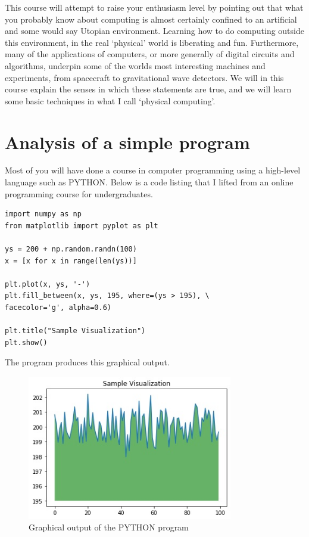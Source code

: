 \documentclass[../physical_computing.tex]{subfiles}
\begin{document}
This course will attempt to raise your enthusiasm level by pointing out that what you probably know about computing is almost certainly confined to an artificial and some would say Utopian environment. Learning how to do computing outside this environment, in the real `physical' world is liberating and fun. Furthermore, many of the applications of computers, or more generally of digital circuits and algorithms, underpin some of the worlds most interesting machines and experiments, from spacecraft to gravitational wave detectors. We will in this course explain the senses in which these statements are true, and we will learn some basic techniques in what I call `physical computing'.

\section{Analysis of a simple program}
\label{sec:projectforstudents}

Most of you will have done a course in computer programming using a high-level language such as PYTHON. Below is a code listing that I lifted from an online programming course for undergraduates.

\begin{verbatim}
import numpy as np
from matplotlib import pyplot as plt

ys = 200 + np.random.randn(100)
x = [x for x in range(len(ys))]

plt.plot(x, ys, '-')
plt.fill_between(x, ys, 195, where=(ys > 195), \
facecolor='g', alpha=0.6)

plt.title("Sample Visualization")
plt.show()
\end{verbatim}
The program produces this graphical output.
\begin{figure}[h!]
    \centering
    \includegraphics[width=0.8\textwidth]{chapter_1/figures/pythongraph.jpg}
    \caption{Graphical output of the PYTHON program}
    \label{fig:pythongraph}
\end{figure}
\end{document}
